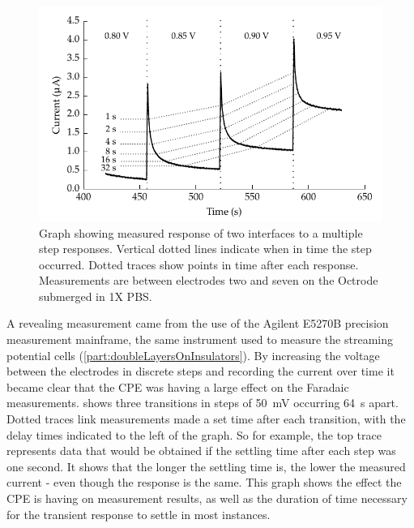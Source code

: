         \begin{figure}
          \centering
          \includegraphics{content/pt2/08-InterfaceParameters/graphics/graph_64s_stirred}
          \caption{\label{fig:pt2-faradaic_decay}Graph showing measured response of two interfaces to a multiple step responses. Vertical dotted lines indicate when in time the step occurred. Dotted traces show points in time after each response. Measurements are between electrodes two and seven on the Octrode submerged in 1X PBS.}
        \end{figure}

        A revealing measurement came from the use of the Agilent E5270B precision measurement mainframe, the same instrument used to measure the streaming potential cells (\cref{part:doubleLayersOnInsulators}).
        By increasing the voltage between the electrodes in discrete steps and recording the current over time it became clear that the CPE was having a large effect on the Faradaic measurements.
         shows three transitions in steps of \SI{50}{\milli\volt} occurring \SI{64}{\second} apart.
        Dotted traces link measurements made a set time after each transition, with the delay times indicated to the left of the graph.
        So for example, the top trace represents data that would be obtained if the settling time after each step was one second.
        It shows that the longer the settling time is, the lower the measured current - even though the response is the same.
        This graph shows the effect the CPE is having on measurement results, as well as the duration of time necessary for the transient response to settle in most instances.

